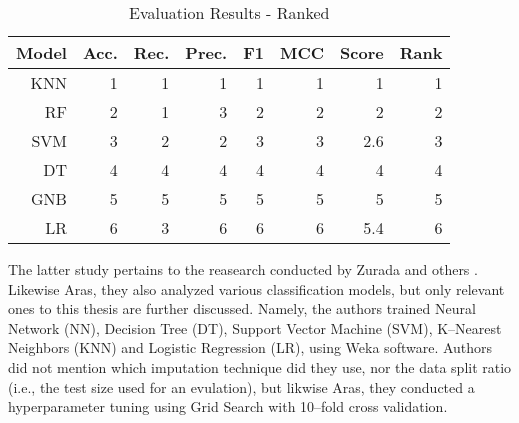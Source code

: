 \begin{table}[H]
    \small
    \setlength{\tabcolsep}{8pt}
    \renewcommand{\arraystretch}{1.3}
    \centering
    \caption[Evaluation Results - Ranked \citep{serkan2021bagging}]{Evaluation Results - Ranked \citep{serkan2021bagging}}\label{tab:serkanresultsranks}
    \begin{tabular}{r r r r r r r r}
    \toprule
    \textbf{Model} & \textbf{Acc.} & \textbf{Rec.} & \textbf{Prec.} & \textbf{F1} & \textbf{MCC} & \textbf{Score} & \textbf{Rank} \\
    \midrule
    \hline
	
    KNN & 1 & 1 & 1 & 1 & 1 & 1 & 1 \\ 
    RF & 2 & 1 & 3 & 2 & 2 & 2 & 2 \\ 
    SVM & 3 & 2 & 2 & 3 & 3 & 2.6 & 3 \\ 
    DT & 4 & 4 & 4 & 4 & 4 & 4 & 4 \\ 
    GNB & 5 & 5 & 5 & 5 & 5 & 5 & 5 \\ 
    LR & 6 & 3 & 6 & 6 & 6 & 5.4 & 6 \\ 
	
    \hline
    \bottomrule
    \end{tabular}
    \vspace{0.35em}
    
    \vspace{-1em}
\end{table}


The latter study pertains to the reasearch conducted by Zurada and others \citep{zurada2014classification}. Likewise Aras, they also analyzed various classification models, but only relevant ones to this thesis are further discussed.
Namely, the authors trained Neural Network (NN), Decision Tree (DT), Support Vector Machine (SVM), K--Nearest Neighbors (KNN) and Logistic Regression (LR), using Weka software.
Authors did not mention which imputation technique did they use, nor the data split ratio (i.e., the test size used for an evulation), but likwise Aras, they conducted a hyperparameter tuning using Grid Search with 10--fold cross validation.

